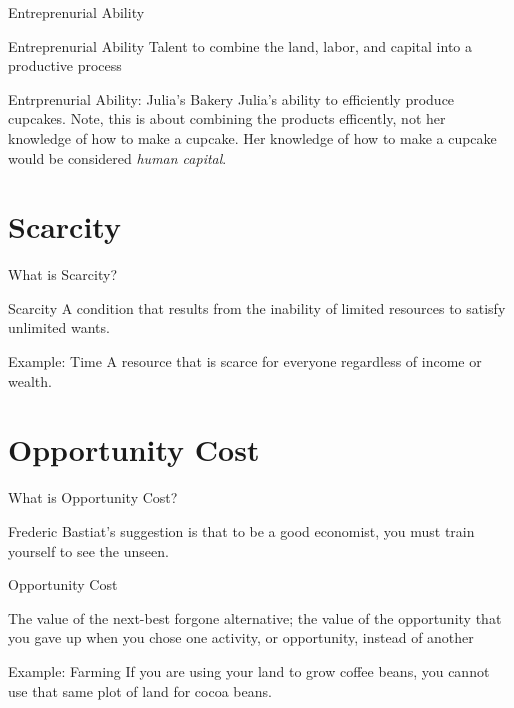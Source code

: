 \documentclass{beamer}
\begin{document}
\begin{frame}{Entreprenurial Ability}

\begin{block}{Entreprenurial Ability}
Talent to combine the land, labor, and capital into a productive process
\end{block}

\begin{exampleblock}{Entrprenurial Ability: Julia's Bakery}
Julia's ability to efficiently produce cupcakes. Note, this is about combining the products efficently, not her knowledge of how to make a cupcake. Her knowledge of how to make a cupcake would be considered \textit{human capital}.
\end{exampleblock}

\end{frame}

\section{Scarcity}


\begin{frame}{What is Scarcity?}

\begin{block}{Scarcity}
A condition that results from the inability of limited resources to satisfy unlimited wants.
\end{block}

\begin{exampleblock}{Example: Time}
A resource that is scarce for everyone regardless of income or wealth.
\end{exampleblock}
\end{frame}

\section{Opportunity Cost}


\begin{frame}{What is Opportunity Cost?}

Frederic Bastiat's suggestion is that to be a good economist, you must train yourself to see the unseen.

\begin{block}{Opportunity Cost}

The value of the next-best forgone alternative; the value of the opportunity that you gave up when you chose one activity, or opportunity, instead of another

\end{block}

\begin{exampleblock}{Example: Farming}
If you are using your land to grow coffee beans, you cannot use that same plot of land for cocoa beans. 
\end{exampleblock}

\end{frame}
\end{document}
